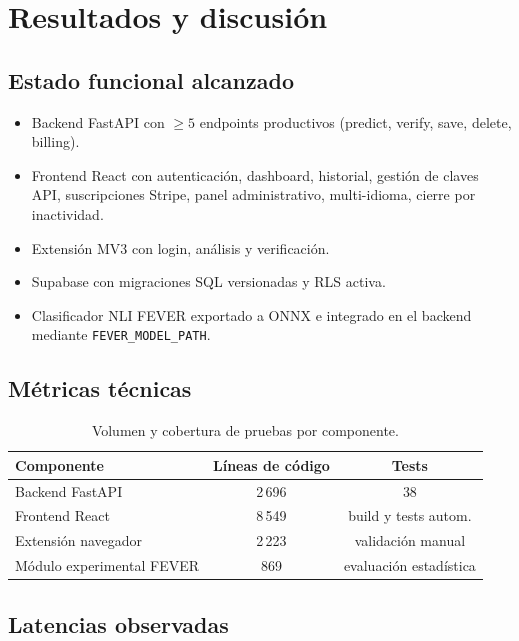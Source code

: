 \chapter{Resultados y discusión}\label{cap:resultados}

\section{Estado funcional alcanzado}

\begin{itemize}[leftmargin=*,itemsep=0.2em]
  \item Backend FastAPI con $\geq 5$ endpoints productivos (predict,
        verify, save, delete, billing).
  \item Frontend React con autenticación, dashboard, historial,
        gestión de claves API, suscripciones Stripe, panel
        administrativo, multi-idioma, cierre por inactividad.
  \item Extensión MV3 con login, análisis y verificación.
  \item Supabase con migraciones SQL versionadas y RLS activa.
      \item Clasificador NLI FEVER exportado a ONNX e integrado en el
                        backend mediante \texttt{FEVER\_MODEL\_PATH}.
\end{itemize}

\section{Métricas técnicas}

\begin{table}[h]
  \centering
  \begin{tabular}{lcc}
    \toprule
    Componente & Líneas de código & Tests \\
    \midrule
      Backend FastAPI         & 2\,696 & 38 \\
      Frontend React          & 8\,549 & build y tests autom. \\
      Extensión navegador     & 2\,223 & validación manual \\
      Módulo experimental FEVER & 869 & evaluación estadística \\
    \bottomrule
  \end{tabular}
  \caption{Volumen y cobertura de pruebas por componente.}
  \label{tab:metricas}
\end{table}

\section{Latencias observadas}


